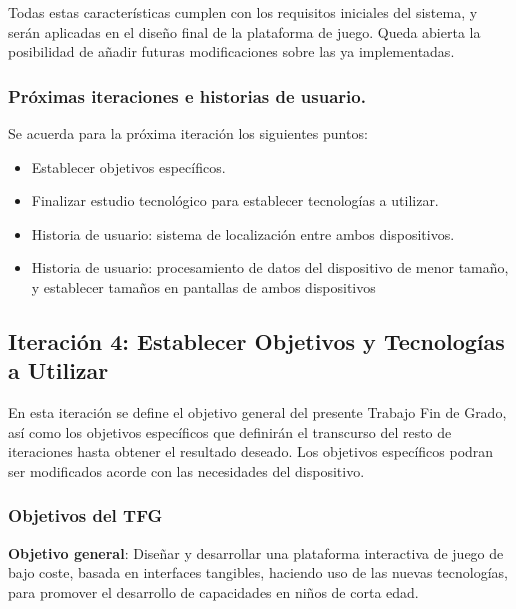 Todas estas características cumplen con los requisitos iniciales del sistema, y serán aplicadas en el diseño final de la plataforma de juego. Queda abierta la posibilidad de añadir futuras modificaciones sobre las ya implementadas.

\subsubsection{Próximas iteraciones e historias de usuario.}
Se acuerda para la próxima iteración los siguientes puntos:
\begin{itemize}
\item Establecer objetivos específicos.
\item Finalizar estudio tecnológico para establecer tecnologías a utilizar.
\item Historia de usuario: sistema de localización entre ambos dispositivos.
\item Historia de usuario: procesamiento de datos del dispositivo de menor tamaño, y establecer tamaños en pantallas de ambos dispositivos
\end{itemize}


\subsection{Iteración 4: Establecer Objetivos y Tecnologías a Utilizar}

En esta iteración se define el objetivo general del presente Trabajo Fin de Grado, así como los objetivos específicos que definirán el transcurso del resto de iteraciones hasta obtener el resultado deseado. Los objetivos específicos podran ser modificados acorde con las necesidades del dispositivo.

\subsubsection{Objetivos del TFG}


\textbf{Objetivo general}: Diseñar y desarrollar una plataforma interactiva de juego de bajo coste, basada en interfaces tangibles, haciendo uso de las nuevas tecnologías, para promover el desarrollo de capacidades en niños de corta edad.

